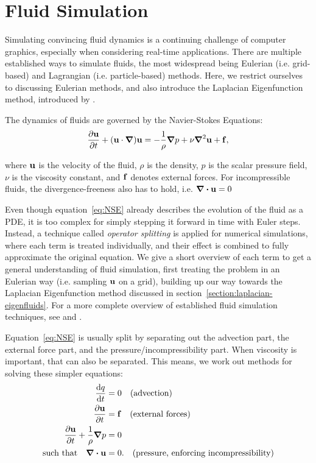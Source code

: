 \chapter{Fluid Simulation}\label{chapter:fluid-simulation}
Simulating convincing fluid dynamics is a continuing challenge of computer
graphics, especially when considering real-time applications. There are multiple
established ways to simulate fluids, the most widespread being Eulerian (i.e.
grid-based) and Lagrangian (i.e. particle-based) methods. Here, we restrict
ourselves to discussing Eulerian methods, and also introduce the Laplacian
Eigenfunction method, introduced by \cite{dewitt}.

The dynamics of fluids are governed by the Navier-Stokes Equations:
\begin{equation}\label{eq:NSE}
    \pdv{\vb{u}}{t} + (\vb{u}\cdot\grad)\vb{u}
    = -\frac{1}{\rho}\grad{p} + \nu\grad^2\vb{u} + \vb{f},
\end{equation}

where $\vb{u}$ is the velocity of the fluid, $\rho$ is the density, $p$ is the
scalar pressure field, $\nu$ is the viscosity constant, and $\vb{f}$ denotes
external forces. For incompressible fluids, the divergence-freeness also has to
hold, i.e. $\div{\vb{u}} = 0$

Even though equation~\eqref{eq:NSE} already describes the evolution of the fluid
as a \acf{PDE}, it is too complex for simply stepping it forward in time with
Euler steps. Instead, a technique called \textit{operator splitting} is applied
for numerical simulations, where each term is treated individually, and their
effect is combined to fully approximate the original equation. We give
a short overview of each term to get a general understanding of fluid
simulation, first treating the problem in an Eulerian way (i.e.  sampling
$\vb{u}$ on a grid), building up our way towards the Laplacian Eigenfunction
method discussed in section~\ref{section:laplacian-eigenfluids}.  For a more
complete overview of established fluid simulation techniques, see
\cite{FluidNotes} and \cite{BridsonFluid}.

Equation~\eqref{eq:NSE} is usually split by separating out the advection part,
the external force part, and the pressure/incompressibility part. When viscosity
is important, that can also be separated. This means, we work out methods for
solving these simpler equations:
\begin{align*}
    \dv{q}{t} &= 0              \qq{(advection)}\\
    \pdv{\vb{u}}{t} &= \vb{f}   \qq{(external forces)}\\
    \pdv{\vb{u}}{t} + \frac{1}{\rho}\grad p &= 0 \\
    \qq{such that}\div{\vb{u}} &= 0.
                                \qq{(pressure, enforcing incompressibility)}
\end{align*}

